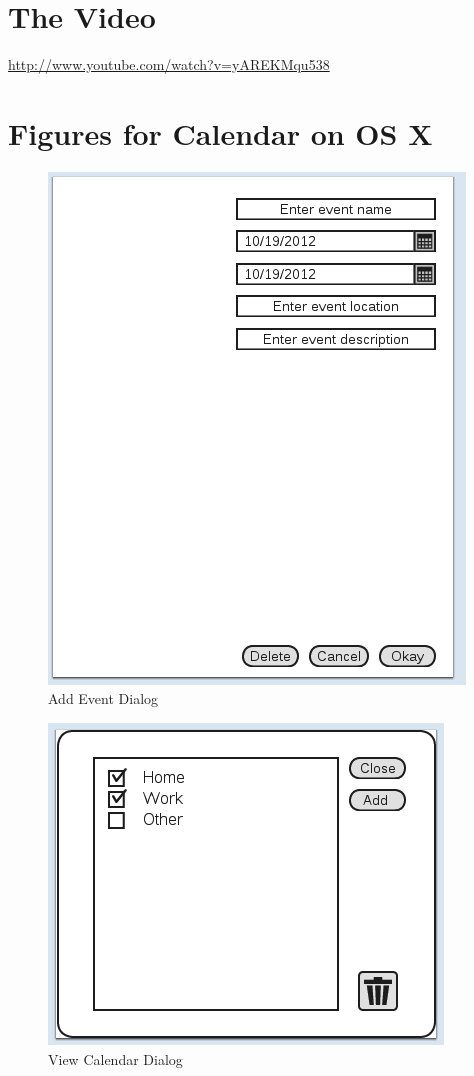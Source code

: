 \documentclass{article}
\begin{document}
\section{The Video}

\url{http://www.youtube.com/watch?v=yAREKMqu538}


\appendix

\section{Figures for Calendar on OS X}

\begin{figure}[hb]
\centering
\includegraphics[scale=0.7]{CMCLGDREvent.png}
\caption{Add Event Dialog}
\label{fig:addevent}
\end{figure}

\begin{figure}[hb]
\centering
\includegraphics[scale=1]{CMCLGDRViewCalendar.png}
\caption{View Calendar Dialog}
\label{fig:viewcal}
\end{figure}
\end{document}
